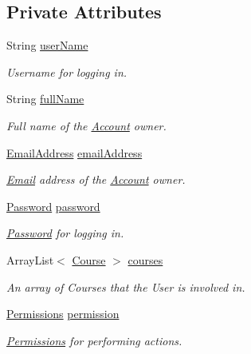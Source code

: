 \subsection*{Private Attributes}
\begin{CompactItemize}
\item 
String \hyperlink{classAccount_82e5741dc469c95deab81dc6cca7736a}{userName}
\begin{CompactList}\small\item\em Username for logging in. \item\end{CompactList}\item 
String \hyperlink{classAccount_0b789f8d14a1938803f8ff2d4f2d8b5e}{fullName}
\begin{CompactList}\small\item\em Full name of the \hyperlink{classAccount}{Account} owner. \item\end{CompactList}\item 
\hyperlink{classEmailAddress}{EmailAddress} \hyperlink{classAccount_4e5039ce78a405ba13acd79da0e16c7f}{emailAddress}
\begin{CompactList}\small\item\em \hyperlink{classEmail}{Email} address of the \hyperlink{classAccount}{Account} owner. \item\end{CompactList}\item 
\hyperlink{classPassword}{Password} \hyperlink{classAccount_d50b726ed8997abb1ac362fd31f183a2}{password}
\begin{CompactList}\small\item\em \hyperlink{classPassword}{Password} for logging in. \item\end{CompactList}\item 
ArrayList$<$ \hyperlink{classCourse}{Course} $>$ \hyperlink{classAccount_465319ae346d4b7e3233f7c3325443dd}{courses}
\begin{CompactList}\small\item\em An array of Courses that the User is involved in. \item\end{CompactList}\item 
\hyperlink{classPermissions}{Permissions} \hyperlink{classAccount_a633f729217a58a51d6878d0c20940cf}{permission}
\begin{CompactList}\small\item\em \hyperlink{classPermissions}{Permissions} for performing actions. \item\end{CompactList}\end{CompactItemize}


